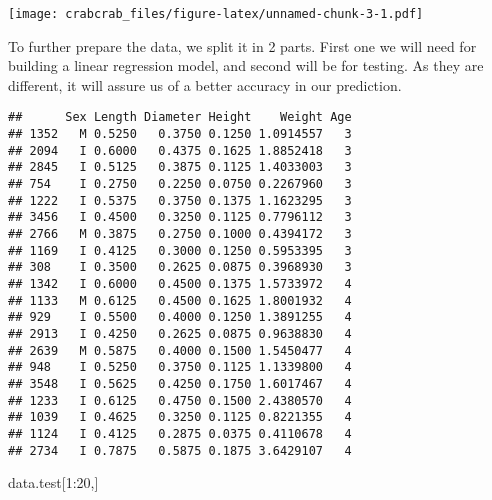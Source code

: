 \documentclass[
]{article}
\newenvironment{Shaded}{\begin{snugshade}}{\end{snugshade}}
\newcommand{\DecValTok}[1]{\textcolor[rgb]{0.00,0.00,0.81}{#1}}
\newcommand{\FunctionTok}[1]{\textcolor[rgb]{0.00,0.00,0.00}{#1}}
\newcommand{\NormalTok}[1]{#1}
\newcommand{\OtherTok}[1]{\textcolor[rgb]{0.56,0.35,0.01}{#1}}
\newcommand{\SpecialCharTok}[1]{\textcolor[rgb]{0.00,0.00,0.00}{#1}}
\begin{document}
\texttt{[image: crabcrab\_files/figure-latex/unnamed-chunk-3-1.pdf]}

To further prepare the data, we split it in 2 parts. First one we will
need for building a linear regression model, and second will be for
testing. As they are different, it will assure us of a better accuracy
in our prediction.

\begin{Shaded}
\end{Shaded}

\begin{verbatim}
##      Sex Length Diameter Height    Weight Age
## 1352   M 0.5250   0.3750 0.1250 1.0914557   3
## 2094   I 0.6000   0.4375 0.1625 1.8852418   3
## 2845   I 0.5125   0.3875 0.1125 1.4033003   3
## 754    I 0.2750   0.2250 0.0750 0.2267960   3
## 1222   I 0.5375   0.3750 0.1375 1.1623295   3
## 3456   I 0.4500   0.3250 0.1125 0.7796112   3
## 2766   M 0.3875   0.2750 0.1000 0.4394172   3
## 1169   I 0.4125   0.3000 0.1250 0.5953395   3
## 308    I 0.3500   0.2625 0.0875 0.3968930   3
## 1342   I 0.6000   0.4500 0.1375 1.5733972   4
## 1133   M 0.6125   0.4500 0.1625 1.8001932   4
## 929    I 0.5500   0.4000 0.1250 1.3891255   4
## 2913   I 0.4250   0.2625 0.0875 0.9638830   4
## 2639   M 0.5875   0.4000 0.1500 1.5450477   4
## 948    I 0.5250   0.3750 0.1125 1.1339800   4
## 3548   I 0.5625   0.4250 0.1750 1.6017467   4
## 1233   I 0.6125   0.4750 0.1500 2.4380570   4
## 1039   I 0.4625   0.3250 0.1125 0.8221355   4
## 1124   I 0.4125   0.2875 0.0375 0.4110678   4
## 2734   I 0.7875   0.5875 0.1875 3.6429107   4
\end{verbatim}

\begin{Shaded}
\begin{Highlighting}[]
\NormalTok{data.test[}\DecValTok{1}\SpecialCharTok{:}\DecValTok{20}\NormalTok{,]}
\end{Highlighting}
\end{Shaded}
\end{document}
